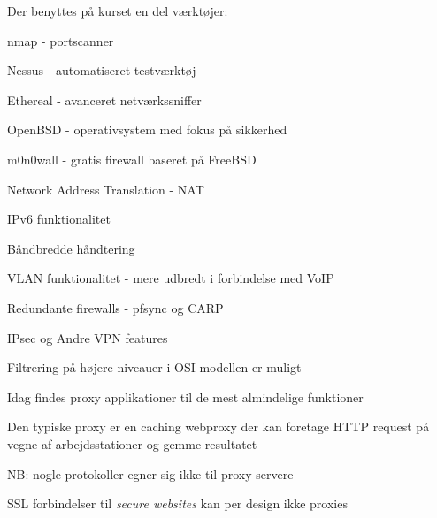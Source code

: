 \documentclass[Screen16to9,17pt]{foils}
\begin{document}
\begin{list1}
\item Der benyttes på kurset en del værktøjer:
\begin{list2}
\item nmap -  portscanner
\item Nessus -  automatiseret testværktøj
\item Ethereal -  avanceret netværkssniffer
\item OpenBSD -  operativsystem med fokus
  på sikkerhed
\item m0n0wall -  gratis firewall baseret på FreeBSD

\end{list2}
\end{list1}


\begin{list2}
\item Network Address Translation - NAT
\item IPv6 funktionalitet

\item Båndbredde håndtering
\item VLAN funktionalitet - mere udbredt i forbindelse med VoIP
\item Redundante firewalls - pfsync og CARP
\item IPsec og Andre VPN features
\end{list2}


\begin{list1}
\item Filtrering på højere niveauer i OSI modellen er muligt
\item Idag findes proxy applikationer til de mest almindelige
  funktioner
\item Den typiske proxy er en caching webproxy der kan foretage HTTP
  request på vegne af arbejdsstationer og gemme resultatet
\item NB: nogle protokoller egner sig ikke til proxy servere
\item SSL forbindelser til \emph{secure websites} kan per design ikke proxies
\end{list1}
\end{document}
